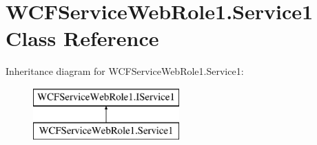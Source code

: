 \hypertarget{class_w_c_f_service_web_role1_1_1_service1}{}\section{W\+C\+F\+Service\+Web\+Role1.\+Service1 Class Reference}
\label{class_w_c_f_service_web_role1_1_1_service1}
Inheritance diagram for W\+C\+F\+Service\+Web\+Role1.\+Service1\+:\begin{figure}[H]
\begin{center}
\leavevmode
\includegraphics[height=2.000000cm]{class_w_c_f_service_web_role1_1_1_service1}
\end{center}
\end{figure}
